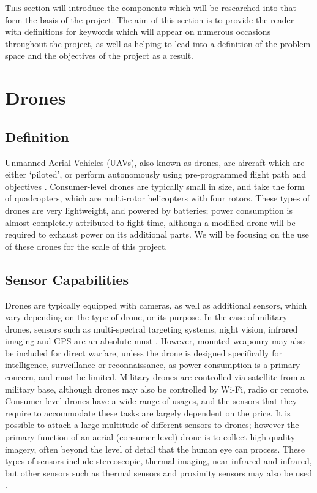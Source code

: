 \lettrine[lines=2]{T}{his} section will introduce the components which will be researched into that form the basis of the project. The aim of this section is to provide the reader with definitions for keywords which will appear on numerous occasions throughout the project, as well as helping to lead into a definition of the problem space and the objectives of the project as a result. 
	\section{Drones}
		\subsection{Definition}
		Unmanned Aerial Vehicles (UAVs), also known as drones, are aircraft which are either ‘piloted’, or perform autonomously using pre-programmed flight path and objectives \cite{chriscolejimwright2010}. Consumer-level drones are typically small in size, and take the form of quadcopters, which are multi-rotor helicopters with four rotors.  These types of drones are very lightweight, and powered by batteries; power consumption is almost completely attributed to fight time, although a modified drone will be required to exhaust power on its additional parts. We will be focusing on the use of these drones for the scale of this project.
		\subsection{Sensor Capabilities}
		Drones are typically equipped with cameras, as well as additional sensors, which vary depending on the type of drone, or its purpose. In the case of military drones, sensors such as multi-spectral targeting systems, night vision, infrared imaging and GPS are an absolute must \cite{usairforce2015}. However, mounted weaponry may also be included for direct warfare, unless the drone is designed specifically for intelligence, surveillance or reconnaissance, as power consumption is a primary concern, and must be limited. Military drones are controlled via satellite from a military base, although drones may also be controlled by Wi-Fi, radio or remote. Consumer-level drones have a wide range of usages, and the sensors that they require to accommodate these tasks are largely dependent on the price. It is possible to attach a large multitude of different sensors to drones; however the primary function of an aerial (consumer-level) drone is to collect high-quality imagery, often beyond the level of detail that the human eye can process.  These types of sensors include stereoscopic, thermal imaging, near-infrared and infrared, but other sensors such as thermal sensors and proximity sensors may also be used \cite{ questuav2015}.
